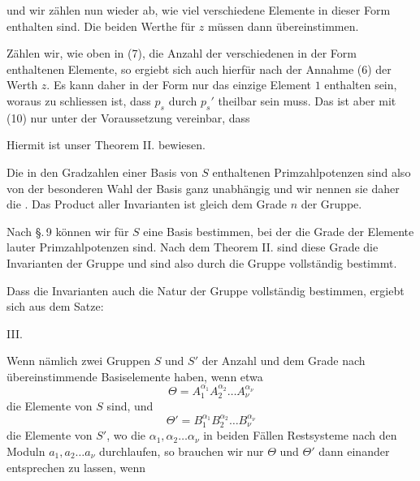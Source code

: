 
und wir zählen nun wieder ab, wie viel verschiedene Elemente
in dieser Form enthalten sind. Die beiden Werthe für $z$ müssen
dann übereinstimmen.

Zählen wir, wie oben in (7), die Anzahl der verschiedenen
in der Form
enthaltenen Elemente, so ergiebt sich auch hierfür nach der Annahme
 (6) der Werth $z$. Es kann daher in der Form
nur das einzige Element $1$ enthalten sein, woraus zu schliessen
ist, dass $p_s$ durch $p_s'$ theilbar sein muss. Das ist aber mit (10)
nur unter der Voraussetzung vereinbar, dass

Hiermit ist unser Theorem II. bewiesen.

Die in den Gradzahlen einer Basis von $S$ enthaltenen Primzahlpotenzen
 sind also von der besonderen Wahl der Basis ganz
unabhängig und wir nennen sie daher die . Das Product aller Invarianten ist gleich dem Grade $n$
der Gruppe.

Nach \S.\,9 können wir für $S$ eine Basis bestimmen, bei der
die Grade der Elemente lauter Primzahlpotenzen sind. Nach
dem Theorem II. sind diese Grade die Invarianten der Gruppe
und sind also durch die Gruppe vollständig bestimmt.

Dass die Invarianten auch die Natur der Gruppe vollständig
bestimmen, ergiebt sich aus dem Satze:

III. 

Wenn nämlich zwei Gruppen $S$ und $S'$ der Anzahl und dem
Grade nach übereinstimmende Basiselemente haben, wenn etwa
\[ \Theta = A_1^{\alpha_1} A_2^{\alpha_2} \ldots A_\nu^{\alpha_\nu} \]
die Elemente von $S$ sind, und
\[ \Theta' = B_1^{\alpha_1} B_2^{\alpha_2} \ldots B_\nu^{\alpha_\nu} \]
die Elemente von $S'$, wo die $\alpha_1, \alpha_2 \ldots \alpha_\nu$ in beiden Fällen Restsysteme
 nach den Moduln $a_1, a_2 \ldots a_\nu$ durchlaufen, so brauchen
wir nur $\Theta$ und $\Theta'$ dann einander entsprechen zu lassen, wenn
